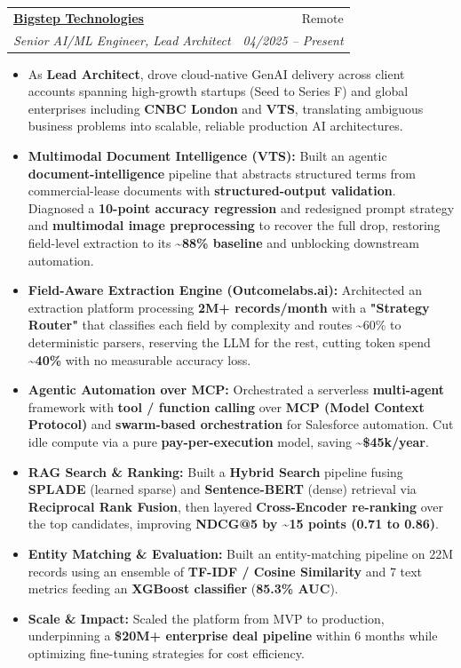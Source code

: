 \documentclass[11pt,a4paper]{article}
\makeatletter
\newcommand{\resumeItem}[1]{
  \item\small{
    {#1 \vspace{-2pt}}
  }
}
\newcommand{\resumeSubheading}[4]{
  \vspace{-1pt}\item
    \begin{tabular*}{0.97\textwidth}[t]{l@{\extracolsep{\fill}}r}
      \textbf{#1} & #2 \\
      \textit{\small#3} & \textit{\small #4} \\
    \end{tabular*}\vspace{-5pt}
}
\newcommand{\resumeItemListStart}{\begin{itemize}[itemsep=2pt, topsep=0pt, partopsep=0pt]}
\newcommand{\resumeItemListEnd}{\end{itemize}\vspace{-5pt}}
\makeatother
\begin{document}
    \resumeSubheading
      {\href{https://bigsteptech.com/}{Bigstep Technologies}}{Remote}
      {Senior AI/ML Engineer, Lead Architect}{04/2025 -- Present}
      \resumeItemListStart
        \resumeItem{As \textbf{Lead Architect}, drove cloud-native GenAI delivery across client accounts spanning high-growth startups (Seed to Series F) and global enterprises including \textbf{CNBC London} and \textbf{VTS}, translating ambiguous business problems into scalable, reliable production AI architectures.}
        \resumeItem{\textbf{Multimodal Document Intelligence (VTS):} Built an agentic \textbf{document-intelligence} pipeline that abstracts structured terms from commercial-lease documents with \textbf{structured-output validation}. Diagnosed a \textbf{10-point accuracy regression} and redesigned prompt strategy and \textbf{multimodal image preprocessing} to recover the full drop, restoring field-level extraction to its \textbf{\textasciitilde{}88\% baseline} and unblocking downstream automation.}
        \resumeItem{\textbf{Field-Aware Extraction Engine (Outcomelabs.ai):} Architected an extraction platform processing \textbf{2M+ records/month} with a \textbf{"Strategy Router"} that classifies each field by complexity and routes \textasciitilde{}60\% to deterministic parsers, reserving the LLM for the rest, cutting token spend \textbf{\textasciitilde{}40\%} with no measurable accuracy loss.}
        \resumeItem{\textbf{Agentic Automation over MCP:} Orchestrated a serverless \textbf{multi-agent} framework with \textbf{tool / function calling} over \textbf{MCP (Model Context Protocol)} and \textbf{swarm-based orchestration} for Salesforce automation. Cut idle compute via a pure \textbf{pay-per-execution} model, saving \textbf{\textasciitilde{}\$45k/year}.}
        \resumeItem{\textbf{RAG Search \& Ranking:} Built a \textbf{Hybrid Search} pipeline fusing \textbf{SPLADE} (learned sparse) and \textbf{Sentence-BERT} (dense) retrieval via \textbf{Reciprocal Rank Fusion}, then layered \textbf{Cross-Encoder re-ranking} over the top candidates, improving \textbf{NDCG@5 by \textasciitilde{}15 points (0.71 to 0.86)}.}
        \resumeItem{\textbf{Entity Matching \& Evaluation:} Built an entity-matching pipeline on 22M records using an ensemble of \textbf{TF-IDF / Cosine Similarity} and 7 text metrics feeding an \textbf{XGBoost classifier} (\textbf{85.3\% AUC}).}
        \resumeItem{\textbf{Scale \& Impact:} Scaled the platform from MVP to production, underpinning a \textbf{\$20M+ enterprise deal pipeline} within 6 months while optimizing fine-tuning strategies for cost efficiency.}
      \resumeItemListEnd
\end{document}
